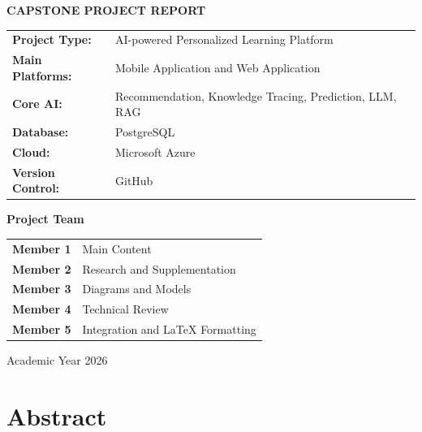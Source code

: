 \begin{titlepage}
\centering
\vspace*{1.2cm}

{\Large \textbf{CAPSTONE PROJECT REPORT}\par}
\vspace{1.2cm}

{\Huge \textbf{\projecttitle}\par}
\vspace{0.8cm}

{\Large \projecttitlevi\par}

\vfill

\begin{tabular}{ll}
\textbf{Project Type:} & AI-powered Personalized Learning Platform\\
\textbf{Main Platforms:} & Mobile Application and Web Application\\
\textbf{Core AI:} & Recommendation, Knowledge Tracing, Prediction, LLM, RAG\\
\textbf{Database:} & PostgreSQL\\
\textbf{Cloud:} & Microsoft Azure\\
\textbf{Version Control:} & GitHub
\end{tabular}

\vfill

{\large \textbf{Project Team}\par}
\vspace{0.3cm}
\begin{tabular}{cl}
\textbf{Member 1} & Main Content\\
\textbf{Member 2} & Research and Supplementation\\
\textbf{Member 3} & Diagrams and Models\\
\textbf{Member 4} & Technical Review\\
\textbf{Member 5} & Integration and LaTeX Formatting
\end{tabular}

\vfill
{\large Academic Year 2026\par}
\end{titlepage}

\hypersetup{pageanchor=false}

\chapter*{Abstract}

